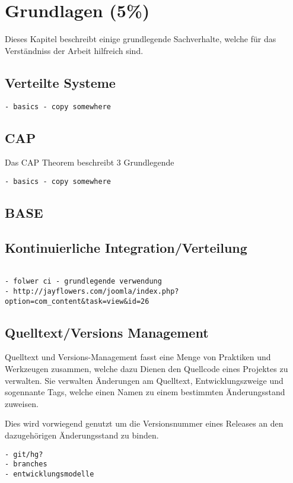 \chapter{Grundlagen (5\%)}
\label{chap:base}
Dieses Kapitel beschreibt einige grundlegende Sachverhalte,
welche f\"ur das Verst\"andniss der Arbeit hilfreich sind.

\section{Verteilte Systeme}
\label{sec:base:vs}

\begin{verbatim}
- basics - copy somewhere
\end{verbatim}

\section{CAP}
\label{sec:base:cap}


% 
Das CAP Theorem beschreibt 3 Grundlegende

\begin{verbatim}
- basics - copy somewhere
\end{verbatim}

\section{BASE}
\label{sec:base:base}

\section{Kontinuierliche Integration/Verteilung}
\label{sec:base:ci}
\begin{verbatim}

- folwer ci - grundlegende verwendung
- http://jayflowers.com/joomla/index.php?option=com_content&task=view&id=26
\end{verbatim}

\section{Quelltext/Versions Management}
\label{sec:base:scm}


Quelltext und Versions-Management fasst eine Menge
von Praktiken und Werkzeugen zusammen,
welche dazu Dienen den Quellcode eines Projektes zu verwalten.
Sie verwalten \"Anderungen am Quelltext, Entwicklungszweige und sogennante Tags,
welche einen Namen zu einem bestimmten \"Anderungsstand zuweisen.

Dies wird vorwiegend genutzt um die Versionsnummer eines Releases an den dazugeh\"origen \"Anderungsstand zu binden.



\begin{verbatim}
- git/hg?
- branches
- entwicklungsmodelle
\end{verbatim}

